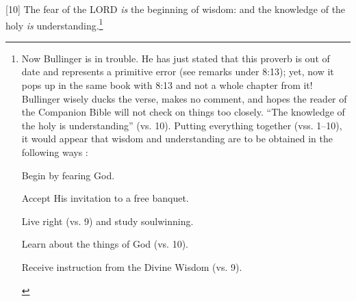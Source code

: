 [10] \textcolor[rgb]{0.00,0.00,1.00}{The fear of the LORD \emph{is} the beginning of wisdom: and the knowledge of the holy \emph{is} understanding.}\footnote{Now Bullinger is in trouble. He has just stated that this proverb is out of date and represents a primitive error (see remarks under 8:13); yet, now it pops up in the same book with 8:13 and not a whole chapter from it! Bullinger wisely ducks the verse, makes no comment, and hopes the reader of the Companion Bible will not check on things too closely. “The knowledge of the holy is understanding” (vs. 10). Putting everything together (vss. 1–10), it would appear that wisdom and understanding are to be obtained in the following ways  \cite{Ruckman1972Proverbs}:
\begin{compactenum}
   \item Begin by fearing God.
   \item Accept His invitation to a free banquet.
   \item Live right (vs. 9) and study soulwinning.
   \item Learn about the things of God (vs. 10).
\item Receive instruction from the Divine Wisdom (vs. 9).
\end{compactenum}
}
